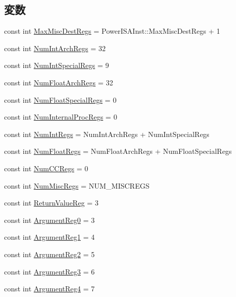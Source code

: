 \subsection*{変数}
\begin{DoxyCompactItemize}
\item 
const int \hyperlink{namespacePowerISA_a47db6c8581feb5d9094784b480156f0b}{MaxMiscDestRegs} = PowerISAInst::MaxMiscDestRegs + 1
\item 
const int \hyperlink{namespacePowerISA_a405c0abe85dc0da846c120e3b31f375c}{NumIntArchRegs} = 32
\item 
const int \hyperlink{namespacePowerISA_aa4755d292c82d3f9a290e04202de41de}{NumIntSpecialRegs} = 9
\item 
const int \hyperlink{namespacePowerISA_a9ec947def3616ab9415089776195fa09}{NumFloatArchRegs} = 32
\item 
const int \hyperlink{namespacePowerISA_a49908eb80616530afc519599ec46e42e}{NumFloatSpecialRegs} = 0
\item 
const int \hyperlink{namespacePowerISA_a66d89afd2b50d65bba7ccdae1dcb19fa}{NumInternalProcRegs} = 0
\item 
const int \hyperlink{namespacePowerISA_a9c412b5118ce369570c156c4e156638a}{NumIntRegs} = NumIntArchRegs + NumIntSpecialRegs
\item 
const int \hyperlink{namespacePowerISA_a627b25288f2452be107872a138df8b85}{NumFloatRegs} = NumFloatArchRegs + NumFloatSpecialRegs
\item 
const int \hyperlink{namespacePowerISA_a717317b863009b3e1b683c3bdddb9fd3}{NumCCRegs} = 0
\item 
const int \hyperlink{namespacePowerISA_a568d4aa96dd7cd963f3b1b1b0446c9c6}{NumMiscRegs} = NUM\_\-MISCREGS
\item 
const int \hyperlink{namespacePowerISA_a472eedbcba9726645062b921f8d07e98}{ReturnValueReg} = 3
\item 
const int \hyperlink{namespacePowerISA_a94fc8e5760c62d7817856f02a1be3cb4}{ArgumentReg0} = 3
\item 
const int \hyperlink{namespacePowerISA_af987b699db00f70e6b0d77312e87b602}{ArgumentReg1} = 4
\item 
const int \hyperlink{namespacePowerISA_a9228292e340b262f43392ff8b1e439db}{ArgumentReg2} = 5
\item 
const int \hyperlink{namespacePowerISA_a951253d463ad7c65cb79fc65b97df41c}{ArgumentReg3} = 6
\item 
const int \hyperlink{namespacePowerISA_aae79adcca6f991f6b4257706be52d860}{ArgumentReg4} = 7

\end{DoxyCompactItemize}
